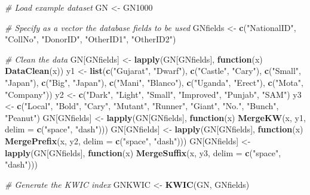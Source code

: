 \documentclass[
]{article}
\newenvironment{Shaded}{\begin{snugshade}}{\end{snugshade}}
\newcommand{\CommentTok}[1]{\textcolor[rgb]{0.56,0.35,0.01}{\textit{#1}}}
\newcommand{\ControlFlowTok}[1]{\textcolor[rgb]{0.13,0.29,0.53}{\textbf{#1}}}
\newcommand{\DataTypeTok}[1]{\textcolor[rgb]{0.13,0.29,0.53}{#1}}
\newcommand{\KeywordTok}[1]{\textcolor[rgb]{0.13,0.29,0.53}{\textbf{#1}}}
\newcommand{\NormalTok}[1]{#1}
\newcommand{\StringTok}[1]{\textcolor[rgb]{0.31,0.60,0.02}{#1}}
\begin{document}
\begin{Shaded}
\begin{Highlighting}[]
\CommentTok{# Load example dataset}
\NormalTok{GN <-}\StringTok{ }\NormalTok{GN1000}

\CommentTok{# Specify as a vector the database fields to be used}
\NormalTok{GNfields <-}\StringTok{ }\KeywordTok{c}\NormalTok{(}\StringTok{"NationalID"}\NormalTok{, }\StringTok{"CollNo"}\NormalTok{, }\StringTok{"DonorID"}\NormalTok{, }\StringTok{"OtherID1"}\NormalTok{, }\StringTok{"OtherID2"}\NormalTok{)}

\CommentTok{# Clean the data}
\NormalTok{GN[GNfields] <-}\StringTok{ }\KeywordTok{lapply}\NormalTok{(GN[GNfields], }\ControlFlowTok{function}\NormalTok{(x) }\KeywordTok{DataClean}\NormalTok{(x))}
\NormalTok{y1 <-}\StringTok{ }\KeywordTok{list}\NormalTok{(}\KeywordTok{c}\NormalTok{(}\StringTok{"Gujarat"}\NormalTok{, }\StringTok{"Dwarf"}\NormalTok{), }\KeywordTok{c}\NormalTok{(}\StringTok{"Castle"}\NormalTok{, }\StringTok{"Cary"}\NormalTok{), }\KeywordTok{c}\NormalTok{(}\StringTok{"Small"}\NormalTok{, }\StringTok{"Japan"}\NormalTok{),}
\KeywordTok{c}\NormalTok{(}\StringTok{"Big"}\NormalTok{, }\StringTok{"Japan"}\NormalTok{), }\KeywordTok{c}\NormalTok{(}\StringTok{"Mani"}\NormalTok{, }\StringTok{"Blanco"}\NormalTok{), }\KeywordTok{c}\NormalTok{(}\StringTok{"Uganda"}\NormalTok{, }\StringTok{"Erect"}\NormalTok{),}
\KeywordTok{c}\NormalTok{(}\StringTok{"Mota"}\NormalTok{, }\StringTok{"Company"}\NormalTok{))}
\NormalTok{y2 <-}\StringTok{ }\KeywordTok{c}\NormalTok{(}\StringTok{"Dark"}\NormalTok{, }\StringTok{"Light"}\NormalTok{, }\StringTok{"Small"}\NormalTok{, }\StringTok{"Improved"}\NormalTok{, }\StringTok{"Punjab"}\NormalTok{, }\StringTok{"SAM"}\NormalTok{)}
\NormalTok{y3 <-}\StringTok{ }\KeywordTok{c}\NormalTok{(}\StringTok{"Local"}\NormalTok{, }\StringTok{"Bold"}\NormalTok{, }\StringTok{"Cary"}\NormalTok{, }\StringTok{"Mutant"}\NormalTok{, }\StringTok{"Runner"}\NormalTok{, }\StringTok{"Giant"}\NormalTok{, }\StringTok{"No."}\NormalTok{,}
        \StringTok{"Bunch"}\NormalTok{, }\StringTok{"Peanut"}\NormalTok{)}
\NormalTok{GN[GNfields] <-}\StringTok{ }\KeywordTok{lapply}\NormalTok{(GN[GNfields],}
                       \ControlFlowTok{function}\NormalTok{(x) }\KeywordTok{MergeKW}\NormalTok{(x, y1, }\DataTypeTok{delim =} \KeywordTok{c}\NormalTok{(}\StringTok{"space"}\NormalTok{, }\StringTok{"dash"}\NormalTok{)))}
\NormalTok{GN[GNfields] <-}\StringTok{ }\KeywordTok{lapply}\NormalTok{(GN[GNfields],}
                       \ControlFlowTok{function}\NormalTok{(x) }\KeywordTok{MergePrefix}\NormalTok{(x, y2, }\DataTypeTok{delim =} \KeywordTok{c}\NormalTok{(}\StringTok{"space"}\NormalTok{, }\StringTok{"dash"}\NormalTok{)))}
\NormalTok{GN[GNfields] <-}\StringTok{ }\KeywordTok{lapply}\NormalTok{(GN[GNfields],}
                       \ControlFlowTok{function}\NormalTok{(x) }\KeywordTok{MergeSuffix}\NormalTok{(x, y3, }\DataTypeTok{delim =} \KeywordTok{c}\NormalTok{(}\StringTok{"space"}\NormalTok{, }\StringTok{"dash"}\NormalTok{)))}

\CommentTok{# Generate the KWIC index}
\NormalTok{GNKWIC <-}\StringTok{ }\KeywordTok{KWIC}\NormalTok{(GN, GNfields)}
\end{Highlighting}
\end{Shaded}
\end{document}
